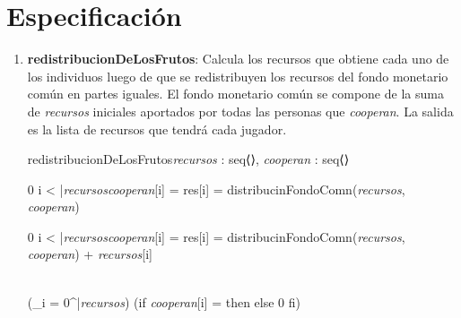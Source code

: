 \documentclass[10pt,a4paper]{article}
\begin{document}
\section{Especificación} 

\begin{enumerate}
    \item \textbf{redistribucionDeLosFrutos}: Calcula los recursos que obtiene cada uno de los individuos luego de que se redistribuyen
    los recursos del fondo monetario común en partes iguales. El fondo monetario común se compone de la suma de \textit{recursos} iniciales aportados por todas las personas que \textit{cooperan}. La salida es la lista de recursos que tendrá cada jugador.

    \begin{proc}{redistribucionDeLosFrutos}{\In \textit{recursos} : seq⟨\real⟩, \In \textit{cooperan} : }
    {seq⟨\real⟩}



    \end{proc}
    

    {
    {0 \leq i < |{\textit{recursos}}\vert \yLuego  \textit{cooperan}[i] = \True \implicaLuego res[i] = 
    distribucinFondoComn(\textit{recursos}, \textit{cooperan})}}
    
    {
    {0 \leq i < |{\textit{recursos}}\vert \yLuego   \textit{cooperan}[i] = \False \implicaLuego res[i] = 
    distribucinFondoComn(\textit{recursos}, \textit{cooperan}) + \textit{recursos}[i]}}

    {\\(\sum_{i = 0}^{|{\textit{recursos}}})
    (if \hspace{2mm} \textit{cooperan}[i] = \True \hspace{2mm} then \hspace{2mm}  \hspace{2mm} else \hspace{2mm} 0 \hspace{2mm} fi)}
    

\end{enumerate}
\end{document}

